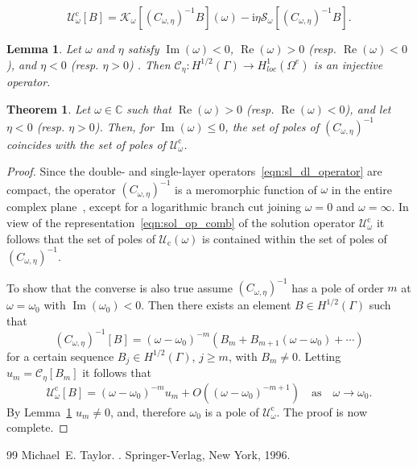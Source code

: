 \documentclass[10pt,a4paper]{amsart}
\newtheorem{lemma}{Lemma}
\newtheorem{theorem}{Theorem}
\renewcommand{\Im}{\operatorname{Im}}
\renewcommand{\Re}{\operatorname{Re}}
\def \inv{^{-1}}
\begin{document}
\begin{equation}\label{eqn:sol_op_comb}
  \mathcal{U}^\mathrm{c}_\omega[B] =  \mathcal{K}_\omega[(C_{\omega,\eta})\inv B](\omega) - \mathrm{i}\eta \mathcal{S}_\omega[(C_{\omega,\eta})\inv B].
\end{equation}

\begin{lemma}\label{lem:Injectivty}
  Let $\omega$ and $\eta$ satisfy $\Im(\omega) < 0$, $\Re(\omega) > 0$
  (resp. $\Re(\omega) < 0$), and $\eta < 0$ (resp. $\eta > 0$)
  . Then $\mathcal{C}_\eta : H^{1/2}(\Gamma) \to H^1_{loc}(\Omega^e)$
  is an injective operator.
\end{lemma}

\begin{theorem}\label{thm:app}
  Let $\omega \in \mathbb{C}$ such that $\Re(\omega) > 0$
  (resp. $\Re(\omega) < 0$), and let $\eta < 0$ (resp. $\eta >
  0$). Then, for $\Im(\omega) \leq 0$, the set of poles of
  $(C_{\omega,\eta})^{-1}$ coincides with the set of poles of
  $\mathcal{U}_{\omega}^\mathrm{c}$.
\end{theorem}

\begin{proof}
  Since the double- and single-layer
  operators~\eqref{eqn:sl_dl_operator} are compact, the operator
  $(C_{\omega,\eta})^{-1}$ is a meromorphic function of $\omega$ in
  the entire complex plane~\cite[Proposition 7.4]{taylorbook}, except
  for a logarithmic branch cut joining $\omega = 0$ and
  $\omega =\infty$. In view of the
  representation~\eqref{eqn:sol_op_comb} of the solution operator
  $\mathcal{U}^\mathrm{c}_\omega$ it follows that the set of poles of
  $\mathcal{U}_\mathrm{c}(\omega)$ is contained within the set of
  poles of $(C_{\omega,\eta})^{-1}$.

  To show that the converse is also true assume
  $(C_{\omega,\eta})\inv$ has a pole of order $m$ at
  $\omega = \omega_0$ with $\Im(\omega_0) < 0$.  Then there exists an
  element $B \in H^{1/2}(\Gamma)$ such that
    \begin{equation*}
      (C_{\omega,\eta})\inv [B] = (\omega - \omega_0)^{-m}\left(B_m + B_{m+1}(\omega - \omega_0) + \cdots\right)
      \end{equation*}
      for a certain sequence $B_j\in H^{1/2}(\Gamma)$, $j\geq m$, with
      $B_m\ne 0.$ Letting $u_m = \mathcal{C}_\eta[B_m]$ it follows
      that
     \begin{equation*}
        \mathcal{U}^\mathrm{c}_\omega [B] = (\omega - \omega_0)^{-m}u_m + O((\omega - \omega_0)^{-m +1}) \quad \mbox{as}\quad \omega \to \omega_0.
     \end{equation*}
     By Lemma~\ref{lem:Injectivty} $u_m \ne 0$, and, therefore
     $\omega_0$ is a pole of $\mathcal{U}^\mathrm{c}_\omega$. The
     proof is now complete.
\end{proof}

\begin{thebibliography}{99}
 Michael~E. Taylor. . \newblock Springer-Verlag, New York, 1996.
\end{thebibliography}
\end{document}
